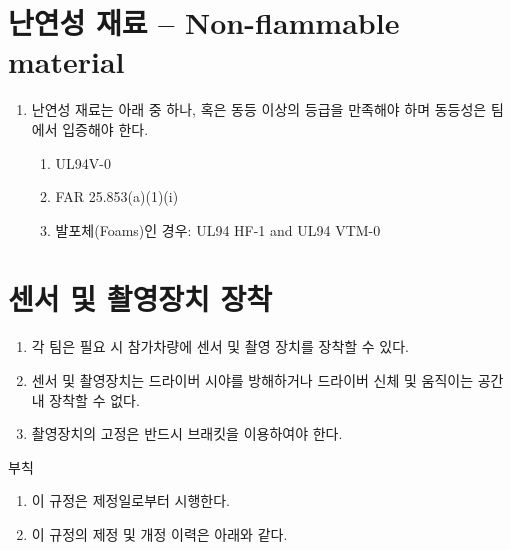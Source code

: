 \documentclass[final,a4paper,10pt]{report}
\begin{document}
\section{난연성 재료 – Non-flammable material}\label{rule:formula-technical.non-flammable-material} \label{section:난연성 재료}
\begin{enumerate}
  \item\label{rule:formula-technical.non-flammable-material.qualifying-standards} 난연성 재료는 아래 중 하나, 혹은 동등 이상의 등급을 만족해야 하며 동등성은 팀에서 입증해야 한다.
    \begin{enumerate}
      \item\label{rule:formula-technical.non-flammable-material.qualifying-standards.ul94v0} UL94V-0
      \item\label{rule:formula-technical.non-flammable-material.qualifying-standards.far25853} FAR 25.853(a)(1)(i)
      \item\label{rule:formula-technical.non-flammable-material.qualifying-standards.foam-ul94-hf1-vtm0} 발포체(Foams)인 경우: UL94 HF-1 and UL94 VTM-0
    \end{enumerate}
\end{enumerate}

\section{{\color{blue}센서 및} 촬영장치 장착}\label{rule:formula-technical.sensors-cameras}
\begin{enumerate}
  \item\label{rule:formula-technical.sensors-cameras.permitted-installation} 각 팀은 필요 시 참가차량에 {\color{blue}센서 및} 촬영 장치를 장착할 수 있다.
  \item\label{rule:formula-technical.sensors-cameras.no-driver-interference} {\color{blue}센서 및} 촬영장치는 드라이버 시야를 방해하거나 드라이버 신체 및 움직이는 공간 내 장착할 수 없다.
  \item\label{rule:formula-technical.sensors-cameras.bracket-mounting-required} 촬영장치의 고정은 반드시 브래킷을 이용하여야 한다.
\end{enumerate}

\clearpage

\RuleIndexEnd

\begin{center}
  부칙
\end{center}

\begin{enumerate}[label=\arabic*.]
  \item 이 규정은 제정일로부터 시행한다.
  \item 이 규정의 제정 및 개정 이력은 아래와 같다.
\end{enumerate}
\end{document}
